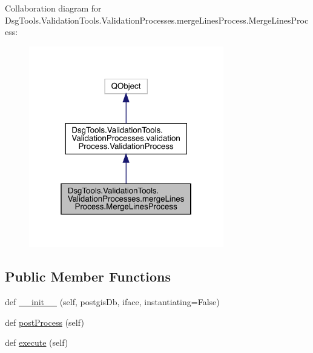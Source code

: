 Collaboration diagram for Dsg\+Tools.\+Validation\+Tools.\+Validation\+Processes.\+merge\+Lines\+Process.\+Merge\+Lines\+Process\+:
\nopagebreak
\begin{figure}[H]
\begin{center}
\leavevmode
\includegraphics[width=241pt]{class_dsg_tools_1_1_validation_tools_1_1_validation_processes_1_1merge_lines_process_1_1_merge_lines_process__coll__graph}
\end{center}
\end{figure}
\subsection*{Public Member Functions}
\begin{DoxyCompactItemize}
\item 
def \mbox{\hyperlink{class_dsg_tools_1_1_validation_tools_1_1_validation_processes_1_1merge_lines_process_1_1_merge_lines_process_af9141d9594009388128355dba358cdb9}{\+\_\+\+\_\+init\+\_\+\+\_\+}} (self, postgis\+Db, iface, instantiating=False)
\item 
def \mbox{\hyperlink{class_dsg_tools_1_1_validation_tools_1_1_validation_processes_1_1merge_lines_process_1_1_merge_lines_process_aff17cedf1d08ff12a85531d40c0dd43a}{post\+Process}} (self)
\item 
def \mbox{\hyperlink{class_dsg_tools_1_1_validation_tools_1_1_validation_processes_1_1merge_lines_process_1_1_merge_lines_process_a08ced55b571d27565f10e2834604e8c7}{execute}} (self)
\end{DoxyCompactItemize}
